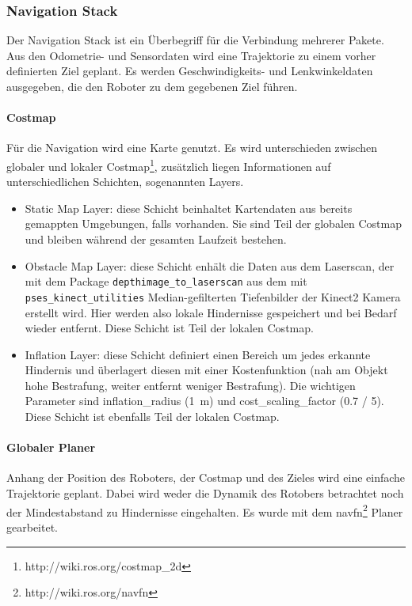 \subsubsection{Navigation Stack}
\label{subsubsec:02navigatinStack}
Der Navigation Stack ist ein \"Uberbegriff f\"ur die Verbindung mehrerer Pakete. Aus den Odometrie- und Sensordaten wird eine Trajektorie zu einem vorher definierten Ziel geplant. Es werden Geschwindigkeits- und Lenkwinkeldaten ausgegeben, die den Roboter zu dem gegebenen Ziel f\"uhren.
\paragraph{Costmap}
F\"ur die Navigation wird eine Karte genutzt. Es wird unterschieden zwischen globaler und lokaler Costmap\footnote{http://wiki.ros.org/costmap\_2d}, zus\"atzlich liegen Informationen auf unterschiedlichen Schichten, sogenannten Layers.
\begin{itemize}
	\item Static Map Layer: diese Schicht beinhaltet Kartendaten aus bereits gemappten Umgebungen, falls vorhanden. Sie sind Teil der globalen Costmap und bleiben w\"ahrend der gesamten Laufzeit bestehen.
	\item Obstacle Map Layer: diese Schicht enh\"alt die Daten aus dem Laserscan, der mit dem Package \texttt{depthimage\_to\_laserscan} aus dem mit \texttt{pses\_kinect\_utilities} Median-gefilterten Tiefenbilder der Kinect2 Kamera erstellt wird. Hier werden also lokale Hindernisse gespeichert und bei Bedarf wieder entfernt. Diese Schicht ist Teil der lokalen Costmap.
	\item Inflation Layer: diese Schicht definiert einen Bereich um jedes erkannte Hindernis und \"uberlagert diesen mit einer Kostenfunktion (nah am Objekt hohe Bestrafung, weiter entfernt weniger Bestrafung). Die wichtigen Parameter sind inflation\_radius (\SI{1}{\meter}) und cost\_scaling\_factor (0.7 / 5). Diese Schicht ist ebenfalls Teil der lokalen Costmap. 
\end{itemize}

\paragraph{Globaler Planer} 
Anhang der Position des Roboters, der Costmap und des Zieles wird eine einfache Trajektorie geplant. Dabei wird weder die Dynamik des Rotobers betrachtet noch der Mindestabstand zu Hindernisse eingehalten. Es wurde mit dem navfn\footnote{http://wiki.ros.org/navfn} Planer gearbeitet.

